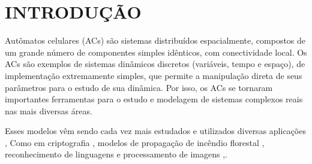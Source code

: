% 
%


\chapter{INTRODUÇÃO}
\label{chap:introducao}
Autômatos celulares (ACs) são sistemas distribuídos espacialmente, compostos de um
grande número de componentes simples idênticos, com conectividade local. Os ACs são
exemplos de sistemas dinâmicos discretos (variáveis, tempo e espaço), de
implementação extremamente simples,  que permite a manipulação direta de seus
parâmetros para o estudo de sua dinâmica. Por isso, os ACs se tornaram importantes
ferramentas para o estudo e modelagem de sistemas complexos reais nas mais diversas
áreas\cite{wolfram1984a}.


Esses modelos vêm sendo cada vez mais estudados e utilizados diversas aplicações \cite{wolframtheoryandapplications}, Como em criptografia \cite{hevertonnewcryptography},
modelos de propagação de incêndio florestal \cite{incendiosflorestais},
reconhecimento de linguagens \cite{reconhecimentolinguagem} e processamento de imagens \cite{celularautomataimage},.
